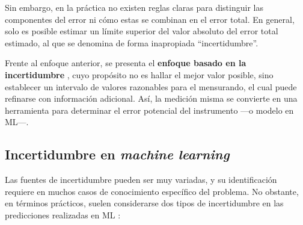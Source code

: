 
Sin embargo, en la práctica no existen reglas claras para distinguir las componentes del error ni cómo estas 
se combinan en el error total. En general, solo es posible estimar un límite superior del valor 
absoluto del error total estimado, al que se denomina de forma inapropiada ``incertidumbre''. 

Frente al enfoque anterior, se presenta el \textbf{enfoque basado en la incertidumbre} \cite{jcgm100:2008}, 
cuyo propósito no es hallar el mejor valor posible, sino establecer un intervalo de valores razonables para el 
mensurando, el cual puede refinarse con información adicional. Así, la medición misma se convierte en una 
herramienta para determinar el error potencial del instrumento ---o modelo en ML---. 


\subsection{Incertidumbre en \textit{machine learning}}

Las fuentes de incertidumbre pueden ser muy variadas, y su identificación requiere en muchos casos de 
conocimiento específico del problema. No obstante, en términos prácticos, suelen considerarse dos tipos de 
incertidumbre en las predicciones realizadas en ML \cite{hullermeier2021, nemani2023}:

